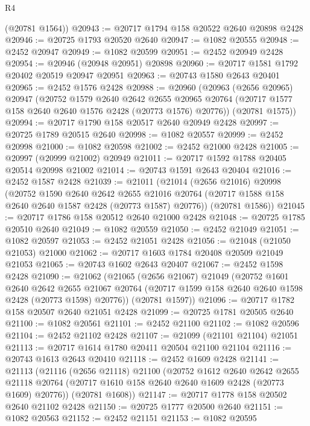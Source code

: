 \begin{lexlean}{R4}
\begin{coremodule}
      (@20781 @1564))
@20943 := @20717 @1794 @158 @20522 @2640 @20898 @2428
@20946 := @20725 @1793 @20520 @2640
@20947 := @1082 @20555
@20948 := @2452 @20947
@20949 := @1082 @20599
@20951 := @2452 @20949 @2428
@20954 := @20946 (@20948 @20951) @20898
@20960 := @20717 @1581 @1792 @20402 @20519 @20947 @20951
@20963 := @20743 @1580 @2643 @20401
@20965 := @2452 @1576 @2428
@20988 := @20960
    (@20963
      (@2656 @20965)
      @20947
      (@20752
        @1579
        @2640
        @2642
        @2655
        @20965
        @20764
        (@20717 @1577 @158 @2640 @2640 @1576 @2428 (@20773 @1576) @20776))
      (@20781 @1575))
@20994 := @20717 @1790 @158 @20517 @2640 @20949 @2428
@20997 := @20725 @1789 @20515 @2640
@20998 := @1082 @20557
@20999 := @2452 @20998
@21000 := @1082 @20598
@21002 := @2452 @21000 @2428
@21005 := @20997 (@20999 @21002) @20949
@21011 := @20717 @1592 @1788 @20405 @20514 @20998 @21002
@21014 := @20743 @1591 @2643 @20404
@21016 := @2452 @1587 @2428
@21039 := @21011
    (@21014
      (@2656 @21016)
      @20998
      (@20752
        @1590
        @2640
        @2642
        @2655
        @21016
        @20764
        (@20717 @1588 @158 @2640 @2640 @1587 @2428 (@20773 @1587) @20776))
      (@20781 @1586))
@21045 := @20717 @1786 @158 @20512 @2640 @21000 @2428
@21048 := @20725 @1785 @20510 @2640
@21049 := @1082 @20559
@21050 := @2452 @21049
@21051 := @1082 @20597
@21053 := @2452 @21051 @2428
@21056 := @21048 (@21050 @21053) @21000
@21062 := @20717 @1603 @1784 @20408 @20509 @21049 @21053
@21065 := @20743 @1602 @2643 @20407
@21067 := @2452 @1598 @2428
@21090 := @21062
    (@21065
      (@2656 @21067)
      @21049
      (@20752
        @1601
        @2640
        @2642
        @2655
        @21067
        @20764
        (@20717 @1599 @158 @2640 @2640 @1598 @2428 (@20773 @1598) @20776))
      (@20781 @1597))
@21096 := @20717 @1782 @158 @20507 @2640 @21051 @2428
@21099 := @20725 @1781 @20505 @2640
@21100 := @1082 @20561
@21101 := @2452 @21100
@21102 := @1082 @20596
@21104 := @2452 @21102 @2428
@21107 := @21099 (@21101 @21104) @21051
@21113 := @20717 @1614 @1780 @20411 @20504 @21100 @21104
@21116 := @20743 @1613 @2643 @20410
@21118 := @2452 @1609 @2428
@21141 := @21113
    (@21116
      (@2656 @21118)
      @21100
      (@20752
        @1612
        @2640
        @2642
        @2655
        @21118
        @20764
        (@20717 @1610 @158 @2640 @2640 @1609 @2428 (@20773 @1609) @20776))
      (@20781 @1608))
@21147 := @20717 @1778 @158 @20502 @2640 @21102 @2428
@21150 := @20725 @1777 @20500 @2640
@21151 := @1082 @20563
@21152 := @2452 @21151
@21153 := @1082 @20595

\end{coremodule}
\end{lexlean}
